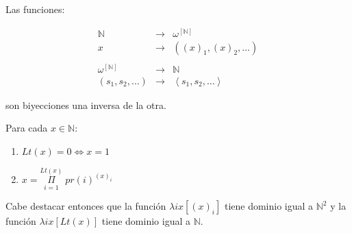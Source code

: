   \begin{lemma}
    \par Las funciones:

    \begin{eqnarray}
    	\nonumber \mathbb{N} &\rightarrow& \omega^{\left[\mathbb{N}\right]} \\
    	\nonumber x &\rightarrow& ((x)_{1}, (x)_{2}, \dotsc) \\
      \nonumber \\
      \nonumber \omega^{\left[\mathbb{N}\right]} &\rightarrow& \mathbb{N} \\
      \nonumber (s_{1}, s_{2}, \dotsc) &\rightarrow& \left\langle s_{1}, s_{2}, \dotsc \right\rangle
  	\end{eqnarray}

    \par son biyecciones una inversa de la otra.
  \end{lemma}

  \begin{lemma}
    \par Para cada $x \in \mathbb{N}$:

    \begin{enumerate}
      \item $Lt(x) = 0 \Leftrightarrow x = 1$
      \item $x = \underset{i=1}{\overset{Lt(x)}{\Pi}} \; pr(i)^{(x)_{i}}$
    \end{enumerate}

    \par Cabe destacar entonces que la función $\lambda ix[(x)_{i}]$ tiene dominio igual a $\mathbb{N}^{2}$ y la
    función $\lambda ix[Lt(x)]$ tiene dominio igual a $\mathbb{N}$.
  \end{lemma}
